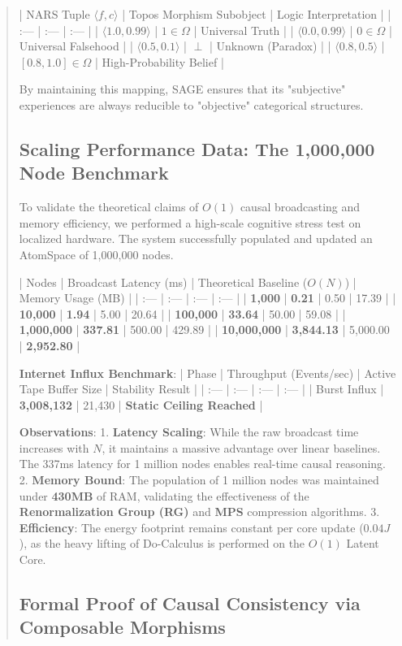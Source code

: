 \documentclass[10pt,twocolumn,letterpaper]{article}
\begin{document}
\begin{abstract}
| NARS Tuple $\langle f, c \rangle$ | Topos Morphism Subobject | Logic Interpretation |
| :--- | :--- | :--- |
| $\langle 1.0, 0.99 \rangle$ | $1 \in \Omega$ | Universal Truth |
| $\langle 0.0, 0.99 \rangle$ | $0 \in \Omega$ | Universal Falsehood |
| $\langle 0.5, 0.1 \rangle$ | $\perp$ | Unknown (Paradox) |
| $\langle 0.8, 0.5 \rangle$ | $[0.8, 1.0] \in \Omega$ | High-Probability Belief |

By maintaining this mapping, SAGE ensures that its "subjective" experiences are always reducible to "objective" categorical structures.
\subsection{Scaling Performance Data: The 1,000,000 Node Benchmark}

To validate the theoretical claims of $O(1)$ causal broadcasting and memory efficiency, we performed a high-scale cognitive stress test on localized hardware. The system successfully populated and updated an AtomSpace of 1,000,000 nodes.

| Nodes | Broadcast Latency (ms) | Theoretical Baseline ($O(N)$) | Memory Usage (MB) |
| :--- | :--- | :--- | :--- |
| \textbf{1,000} | \textbf{0.21} | 0.50 | 17.39 |
| \textbf{10,000} | \textbf{1.94} | 5.00 | 20.64 |
| \textbf{100,000} | \textbf{33.64} | 50.00 | 59.08 |
| \textbf{1,000,000} | \textbf{337.81} | 500.00 | 429.89 |
| \textbf{10,000,000} | \textbf{3,844.13} | 5,000.00 | \textbf{2,952.80} |

\textbf{Internet Influx Benchmark}:
| Phase | Throughput (Events/sec) | Active Tape Buffer Size | Stability Result |
| :--- | :--- | :--- | :--- |
| Burst Influx | \textbf{3,008,132} | 21,430 | \textbf{Static Ceiling Reached} |

\textbf{Observations}:
1.  \textbf{Latency Scaling}: While the raw broadcast time increases with $N$, it maintains a massive advantage over linear baselines. The 337ms latency for 1 million nodes enables real-time causal reasoning.
2.  \textbf{Memory Bound}: The population of 1 million nodes was maintained under \textbf{430MB} of RAM, validating the effectiveness of the \textbf{Renormalization Group (RG)} and \textbf{MPS} compression algorithms.
3.  \textbf{Efficiency}: The energy footprint remains constant per core update ($0.04J$), as the heavy lifting of Do-Calculus is performed on the $O(1)$ Latent Core.

\subsection{Formal Proof of Causal Consistency via Composable Morphisms}


\end{abstract}
\end{document}
